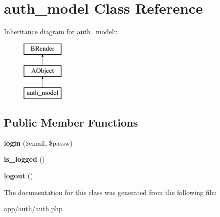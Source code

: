 \section{auth\_\-model Class Reference}
\label{classauth__model}
Inheritance diagram for auth\_\-model::\begin{figure}[H]
\begin{center}
\leavevmode
\includegraphics[height=3cm]{classauth__model}
\end{center}
\end{figure}
\subsection*{Public Member Functions}
\begin{DoxyCompactItemize}
\item 
{\bfseries login} (\$email, \$passw)\label{classauth__model_acbe307e31c0a85cd886a3fdf8c1f6254}

\item 
{\bfseries is\_\-logged} ()\label{classauth__model_a38e6d54c77a25901e5d6b8f7f0c6f3f0}

\item 
{\bfseries logout} ()\label{classauth__model_a082405d89acd6835c3a7c7a08a7adbab}

\end{DoxyCompactItemize}


The documentation for this class was generated from the following file:\begin{DoxyCompactItemize}
\item 
app/auth/auth.php\end{DoxyCompactItemize}
